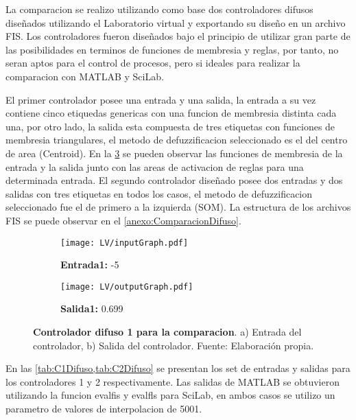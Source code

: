         La comparacion se realizo utilizando como base dos controladores difusos diseñados utilizando el Laboratorio virtual y exportando su diseño en un archivo FIS. Los controladores fueron diseñados bajo el principio de utilizar gran parte de las posibilidades en terminos de funciones de membresia y reglas, por tanto, no seran aptos para el control de procesos, pero si ideales para realizar la comparacion con MATLAB y SciLab.

        El primer controlador posee una entrada y una salida, la entrada a su vez contiene cinco etiquedas genericas con una funcion de membresia distinta cada una, por otro lado, la salida esta compuesta de tres etiquetas con funciones de membresia triangulares, el metodo de defuzzificacion seleccionado es el del centro de area (Centroid). En la \cref{fig:controladorDifuso} se pueden observar las funciones de membresia de la entrada y la salida junto con las areas de activacion de reglas para una determinada entrada. El segundo controlador diseñado posee dos entradas y dos salidas con tres etiquetas en todos los casos, el metodo de defuzzificacion seleccionado fue el de primero a la izquierda (SOM). La estructura de los archivos FIS se puede observar en el \ref{anexo:ComparacionDifuso}.

        \vspace{10pt}

        \begin{figure}[htb]
            \centering
            \begin{subfigure}[t]{0.49\textwidth}
                \centering
                \texttt{[image: LV/inputGraph.pdf]}
                \caption{\textbf{Entrada1:} -5}
                \label{fig:inputGraph}
            \end{subfigure}
            \hfill
            \begin{subfigure}[t]{0.49\textwidth}
                \centering
                \texttt{[image: LV/outputGraph.pdf]}
                \caption{\textbf{Salida1:} 0.699}
                \label{fig:outputGraph}
            \end{subfigure}
            
            \caption[Controlador difuso 1 para la comparacion]{\textbf{Controlador difuso 1 para la comparacion}. a) Entrada del controlador, b) Salida del controlador. Fuente: Elaboración propia. \label{fig:controladorDifuso}}
        \end{figure}

        En las \cref{tab:C1Difuso,tab:C2Difuso} se presentan los set de entradas y salidas para los controladores 1 y 2 respectivamente. Las salidas de MATLAB se obtuvieron utilizando la funcion evalfis y evalfls para SciLab, en ambos casos se utilizo un parametro de valores de interpolacion de 5001. 

